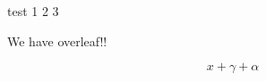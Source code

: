 \documentclass[english]{article}
\begin{document}
test 1 2 3

We have overleaf!!

$$
x+\gamma + \alpha
$$
\end{document}
